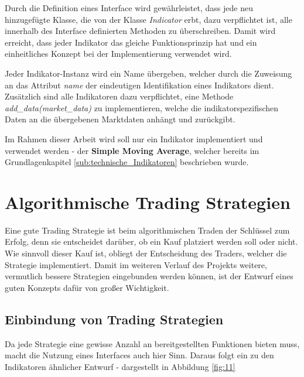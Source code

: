 \documentclass[oneside]{ausarbeitung}
\begin{document}
Durch die Definition eines Interface wird gewährleistet, dass jede neu hinzugefügte Klasse, die von der Klasse \textit{Indicator} erbt, dazu verpflichtet ist, alle innerhalb des Interface definierten Methoden zu überschreiben. Damit wird erreicht, dass jeder Indikator das gleiche Funktionsprinzip hat und ein einheitliches Konzept bei der Implementierung verwendet wird.

Jeder Indikator-Instanz wird ein Name übergeben, welcher durch die Zuweisung an das Attribut \textit{name} der eindeutigen Identifikation eines Indikators dient. Zusätzlich sind alle Indikatoren dazu verpflichtet, eine Methode \textit{add\_data(market\_data)} zu implementieren, welche die indikatorspezifischen Daten an die übergebenen Marktdaten anhängt und zurückgibt.

Im Rahmen dieser Arbeit wird soll nur ein Indikator implementiert und verwendet werden - der \textbf{Simple Moving Average}, welcher bereits im Grundlagenkapitel \ref{sub:technische_Indikatoren} beschrieben wurde.


\section{Algorithmische Trading Strategien}
\label{sec:algorithmische_trading_strategien}

Eine gute Trading Strategie ist beim algorithmischen Traden der Schlüssel zum Erfolg, denn sie entscheidet darüber, ob ein Kauf platziert werden soll oder nicht. Wie sinnvoll dieser Kauf ist, obliegt der Entscheidung des Traders, welcher die Strategie implementiert. Damit im weiteren Verlauf des Projekts weitere, vermutlich bessere Strategien eingebunden werden können, ist der Entwurf eines guten Konzepts dafür von großer Wichtigkeit.

\subsection{Einbindung von Trading Strategien}
\label{sub:einbindung_von_trading_strategien}

Da jede Strategie eine gewisse Anzahl an bereitgestellten Funktionen bieten muss, macht die Nutzung eines Interfaces auch hier Sinn. Daraus folgt ein zu den Indikatoren ähnlicher Entwurf - dargestellt in Abbildung \ref{fig:11}
\end{document}
